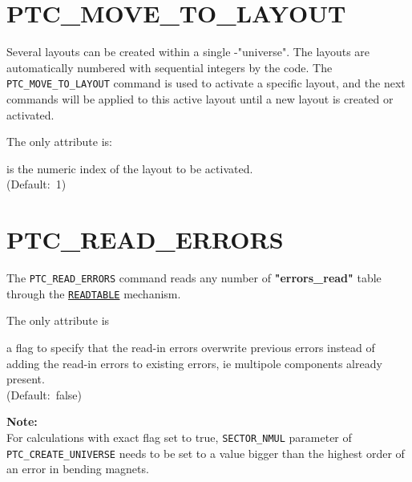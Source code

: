 \section{PTC\_MOVE\_TO\_LAYOUT}
\label{sec:ptc-move-to-layout}

Several \ptc layouts can be created within a single \ptc-"universe".
The layouts are automatically numbered with sequential integers by the
\madx code. The \texttt{PTC\_MOVE\_TO\_LAYOUT} command is used to
activate a specific layout, and the next \ptc commands will be
applied to this active \ptc layout until a new \ptc layout is created
or activated.


The only attribute is:
\begin{madlist}
	 is the numeric index of the \ptc layout to be
	activated.\\ (Default:~1)
\end{madlist}

\section{PTC\_READ\_ERRORS}
\label{sec:ptc-read-errors}

The \texttt{PTC\_READ\_ERRORS} command reads any number of
\textbf{"errors\_read"} table through the
\hyperref[sec:readtable]{\texttt{READTABLE}} mechanism.


The only attribute is
\begin{madlist}
    a flag to specify that the read-in errors
   overwrite previous errors instead of adding the read-in errors to
   existing errors, ie multipole components already present.\\
   (Default:~false)
\end{madlist}

\textbf{Note:}\\
  For calculations with exact flag set to true,
  \texttt{SECTOR\_NMUL} parameter of \texttt{PTC\_CREATE\_UNIVERSE}
  needs to be set to a value bigger than the highest order of an error in bending magnets.

